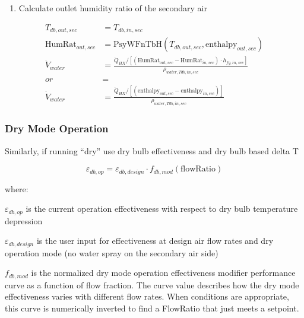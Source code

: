 \begin{enumerate}
\def\labelenumi{\arabic{enumi}.}
\setcounter{enumi}{2}
\tightlist
\item
  Calculate outlet humidity ratio of the secondary air
\end{enumerate}

\begin{equation}
  \begin{array}{rl}
    T_{db,out,sec} & = T_{db,in,sec} \\
    \text{HumRat}_{out,sec} & = \text{PsyWFnTbH}\left(T_{db,out,sec},\text{enthalpy}_{out,sec}\right) \\
    \dot{V}_{water} & = \frac{\dot{Q}_{HX} / \left[ \left(\text{HumRat}_{out,sec}-\text{HumRat}_{in,sec}\right) \cdot h_{fg,in,sec}\right]}{\rho_{water,Tdb,in,sec}} \\
    or & = \\
    \dot{V}_{water} & = \frac{\dot{Q}_{HX} / \left[ \left(\text{enthalpy}_{out,sec}-\text{enthalpy}_{in,sec}\right) \right]}{\rho_{water,Tdb,in,sec}}
  \end{array}
\end{equation}

\subsubsection{Dry Mode Operation}\label{dry-mode-operation}

Similarly, if running ``dry'' use dry bulb effectiveness and dry bulb based delta T

\begin{equation}
\varepsilon_{db,op} = \varepsilon_{db,design} \cdot f_{db,mod}\left(\text{flowRatio}\right)
\end{equation}

where:

\(\varepsilon_{db,op}\) is the current operation effectiveness with respect to dry bulb temperature depression

\(\varepsilon_{db,design}\) is the user input for effectiveness at design air flow rates and dry operation mode (no water spray on the secondary air side)

\(f_{db,mod}\) is the normalized dry mode operation effectiveness modifier performance curve as a function of flow fraction. The curve value describes how the dry mode effectiveness varies with different flow rates. When conditions are appropriate, this curve is numerically inverted to find a FlowRatio that just meets a setpoint.

